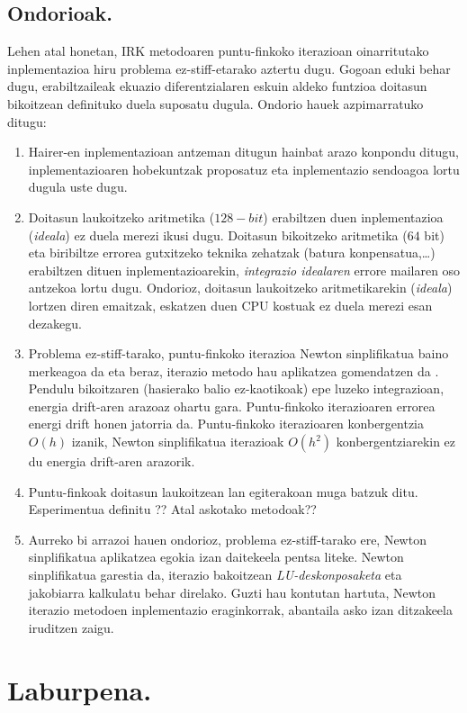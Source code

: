 \subsection{Ondorioak.}

Lehen atal honetan, IRK metodoaren puntu-finkoko iterazioan oinarritutako inplementazioa hiru problema ez-stiff-etarako aztertu dugu. Gogoan eduki behar dugu, erabiltzaileak ekuazio diferentzialaren eskuin aldeko funtzioa doitasun bikoitzean definituko duela suposatu dugula. Ondorio hauek azpimarratuko ditugu:   

\begin{enumerate}

\item Hairer-en inplementazioan antzeman ditugun hainbat arazo konpondu ditugu, inplementazioaren hobekuntzak proposatuz eta inplementazio sendoagoa lortu dugula uste dugu. 

\item Doitasun laukoitzeko aritmetika ($128-bit$) erabiltzen duen inplementazioa (\emph{ideala}) ez duela merezi ikusi dugu. Doitasun bikoitzeko aritmetika ($64$ bit) eta biribiltze errorea gutxitzeko teknika zehatzak (batura konpensatua,\dots) erabiltzen dituen inplementazioarekin, \emph{integrazio idealaren} errore mailaren oso antzekoa lortu dugu. Ondorioz, doitasun laukoitzeko aritmetikarekin (\emph{ideala}) lortzen diren emaitzak, eskatzen duen CPU kostuak ez duela merezi esan dezakegu. 

\item Problema ez-stiff-tarako, puntu-finkoko iterazioa Newton sinplifikatua baino merkeagoa da eta beraz, iterazio metodo hau aplikatzea gomendatzen da \cite{Hairer2006}. Pendulu bikoitzaren (hasierako balio ez-kaotikoak) epe luzeko integrazioan, energia drift-aren arazoaz  ohartu gara. Puntu-finkoko iterazioaren errorea energi drift honen jatorria da. Puntu-finkoko iterazioaren konbergentzia $O(h)$ izanik, Newton sinplifikatua iterazioak $O(h^2)$ konbergentziarekin ez du energia drift-aren arazorik.   

\item Puntu-finkoak doitasun laukoitzean lan egiterakoan muga batzuk ditu. Esperimentua definitu ?? Atal askotako metodoak??

\item Aurreko bi arrazoi hauen ondorioz, problema ez-stiff-tarako ere, Newton sinplifikatua aplikatzea egokia izan daitekeela pentsa liteke. Newton sinplifikatua garestia da, iterazio bakoitzean \emph{LU-deskonposaketa} eta jakobiarra kalkulatu behar direlako.
Guzti hau kontutan hartuta, Newton iterazio metodoen inplementazio eraginkorrak, abantaila asko izan ditzakeela iruditzen zaigu.        

\end{enumerate} 


\section{Laburpena.}
